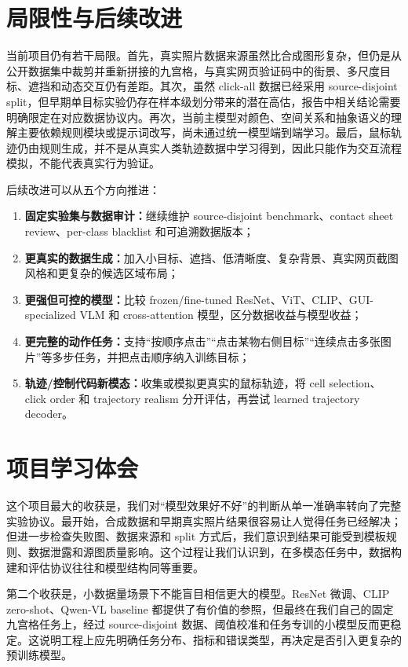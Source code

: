 \documentclass[UTF8,a4paper,12pt,fontset=fandol]{ctexart}
\begin{document}
\section{局限性与后续改进}

当前项目仍有若干局限。首先，真实照片数据来源虽然比合成图形复杂，但仍是从公开数据集中裁剪并重新拼接的九宫格，与真实网页验证码中的街景、多尺度目标、遮挡和动态交互仍有差距。其次，虽然 click-all 数据已经采用 source-disjoint split，但早期单目标实验仍存在样本级划分带来的潜在高估，报告中相关结论需要明确限定在对应数据协议内。再次，当前主模型对颜色、空间关系和抽象语义的理解主要依赖规则模块或提示词改写，尚未通过统一模型端到端学习。最后，鼠标轨迹仍由规则生成，并不是从真实人类轨迹数据中学习得到，因此只能作为交互流程模拟，不能代表真实行为验证。

后续改进可以从五个方向推进：
\begin{enumerate}[leftmargin=2em]
  \item \textbf{固定实验集与数据审计：}继续维护 source-disjoint benchmark、contact sheet review、per-class blacklist 和可追溯数据版本；
  \item \textbf{更真实的数据生成：}加入小目标、遮挡、低清晰度、复杂背景、真实网页截图风格和更复杂的候选区域布局；
  \item \textbf{更强但可控的模型：}比较 frozen/fine-tuned ResNet、ViT、CLIP、GUI-specialized VLM 和 cross-attention 模型，区分数据收益与模型收益；
  \item \textbf{更完整的动作任务：}支持“按顺序点击”“点击某物右侧目标”“连续点击多张图片”等多步任务，并把点击顺序纳入训练目标；
  \item \textbf{轨迹/控制代码新模态：}收集或模拟更真实的鼠标轨迹，将 cell selection、click order 和 trajectory realism 分开评估，再尝试 learned trajectory decoder。
\end{enumerate}

\section{项目学习体会}

这个项目最大的收获是，我们对“模型效果好不好”的判断从单一准确率转向了完整实验协议。最开始，合成数据和早期真实照片结果很容易让人觉得任务已经解决；但进一步检查失败图、数据来源和 split 方式后，我们意识到结果可能受到模板规则、数据泄露和源图质量影响。这个过程让我们认识到，在多模态任务中，数据构建和评估协议往往和模型结构同等重要。

第二个收获是，小数据量场景下不能盲目相信更大的模型。ResNet 微调、CLIP zero-shot、Qwen-VL baseline 都提供了有价值的参照，但最终在我们自己的固定九宫格任务上，经过 source-disjoint 数据、阈值校准和任务专训的小模型反而更稳定。这说明工程上应先明确任务分布、指标和错误类型，再决定是否引入更复杂的预训练模型。
\end{document}
